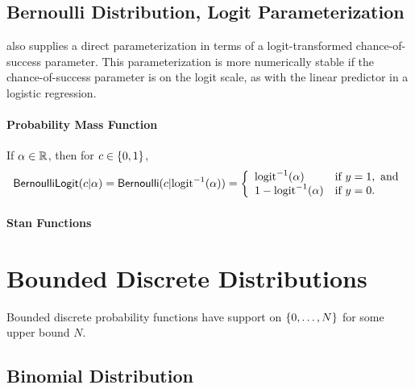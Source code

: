 \section{Bernoulli Distribution, Logit Parameterization}\label{bernoulli-logit-distribution.section}

\Stan also supplies a direct parameterization in terms of a
logit-transformed chance-of-success parameter.  This parameterization
is more numerically stable if the chance-of-success parameter is on
the logit scale, as with the linear predictor in a logistic
regression.  

\subsubsection{Probability Mass Function}

If $\alpha \in \reals$, then for $c \in \setlist{0,1}$,
\[
\distro{BernoulliLogit}(c|\alpha)
=
\distro{Bernoulli}(c|\mbox{logit}^{-1}(\alpha))
= 
\left\{
\begin{array}{ll}
\mbox{logit}^{-1}(\alpha) & \mbox{if } y = 1, \mbox{ and}
\\
1 - \mbox{logit}^{-1}(\alpha) & \mbox{if } y = 0.
\end{array}
\right.
\]


\subsubsection{Stan Functions}

\begin{description}
%
%
\end{description}



\chapter{Bounded Discrete Distributions}\label{betafun.chapter}

\noindent
Bounded discrete probability functions have support on
$\setlist{0,\ldots,N}$ for some upper bound $N$.


\section{Binomial Distribution}

